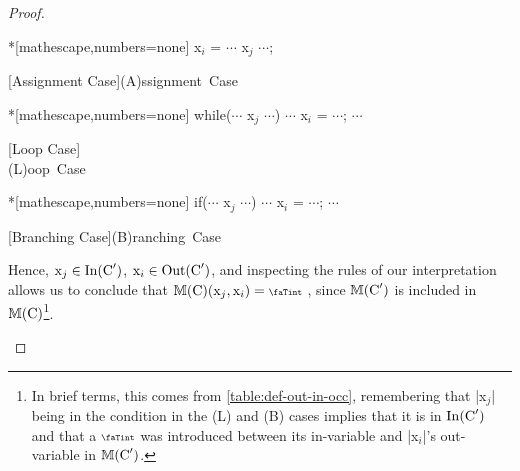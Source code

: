 \begin{proof}
\begin{description}
\begin{minipage}[t]{.3\linewidth}%
\begin{whilelisting}*[mathescape,numbers=none]
x$_i$ = $\cdots$ x$_j$ $\cdots$;
\end{whilelisting}
[Assignment Case]{\mbox{(A)ssignment Case}}
\label{listing-A}
\end{minipage}\hfill%
\begin{minipage}[t]{.3\linewidth}
\begin{whilelisting}*[mathescape,numbers=none]
while($\cdots$ x$_j$ $\cdots$){
  $\cdots$
  x$_i$ = $\cdots$;
  $\cdots$
}
\end{whilelisting}
[Loop Case]{\\\mbox{(L)oop Case}}
\label{listing-L}
\end{minipage}\hfill%
%
\begin{minipage}[t]{.3\linewidth}
\begin{whilelisting}*[mathescape,numbers=none]
if($\cdots$ x$_j$ $\cdots$){
  $\cdots$
  x$_i$ = $\cdots$;
  $\cdots$
}
\end{whilelisting}
[Branching Case]{\mbox{(B)ranching Case}}
\label{listing-I}
\end{minipage}

Hence, \(\prc|x$_j$| \in \In(\prc|C|')\), \(\prc|x$_i$| \in \Out(\prc|C|')\),
and inspecting the rules of our interpretation allows us to conclude that
\(\sfm{\prc|C|}(\prc|x$_j$|,\prc|x$_i$|)= \vi\) , since \(\sfm{\prc|C|'}\) is
included in \(\sfm{\prc|C|}\)\footnote{In brief terms, this comes from
\autoref{table:def-out-in-occ}, remembering that \prc|x$_j$| being in the
condition in the (L) and (B) cases implies that it is in \(\In(\prc|C|')\) and
that a \(\vi\) was introduced between its in-variable and \prc|x$_i$|'s
out-variable in \(\sfm{\prc|C|'}\).}.


\end{description}
\end{proof}
